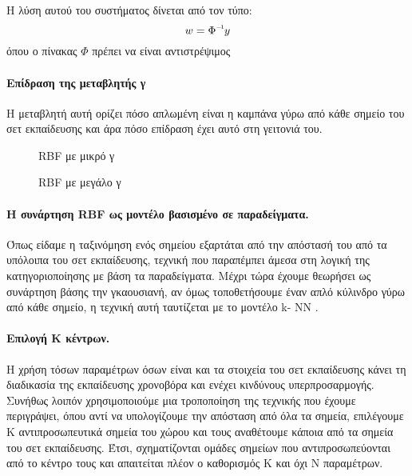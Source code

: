 Η λύση αυτού του συστήματος δίνεται από τον τύπο:
$$w=\inv{\Phi} y$$
όπου ο πίνακας $\Phi$ πρέπει να είναι αντιστρέψιμος

\paragraph{Επίδραση της μεταβλητής γ} Η μεταβλητή αυτή ορίζει πόσο απλωμένη είναι η καμπάνα γύρω από κάθε σημείο του σετ εκπαίδευσης και άρα πόσο επίδραση έχει αυτό στη γειτονιά του.
\begin{figure}[H]
	\centering
	\begin{minipage}{.5\textwidth}
		\centering
		\caption[RBF με μικρό γ]{RBF με μικρό γ}
		
	\end{minipage}%
	\begin{minipage}{0.5\textwidth}
		\centering
		\caption[RBF με μεγάλο γ]{RBF με μεγάλο γ}
		
	\end{minipage}
\end{figure}
\paragraph{H συνάρτηση RBF ως μοντέλο βασισμένο σε παραδείγματα.} Όπως είδαμε η ταξινόμηση ενός σημείου εξαρτάται από την απόστασή του από τα υπόλοιπα του σετ εκπαίδευσης, τεχνική που παραπέμπει άμεσα στη λογική της κατηγοριοποίησης με βάση τα παραδείγματα. Μέχρι τώρα έχουμε θεωρήσει ως συνάρτηση βάσης την γκαουσιανή, αν όμως τοποθετήσουμε έναν απλό κύλινδρο γύρω από κάθε σημείο, η τεχνική αυτή ταυτίζεται με το μοντέλο k-
NN .
\paragraph{Επιλογή Κ κέντρων.} Η χρήση τόσων παραμέτρων όσων είναι και τα στοιχεία του σετ εκπαίδευσης κάνει τη διαδικασία της εκπαίδευσης χρονοβόρα και ενέχει κινδύνους υπερπροσαρμογής. Συνήθως λοιπόν χρησιμοποιούμε μια τροποποίηση της τεχνικής που έχουμε περιγράψει, όπου αντί να υπολογίζουμε την απόσταση από όλα τα σημεία, επιλέγουμε Κ αντιπροσωπευτικά σημεία του χώρου και τους αναθέτουμε κάποια από τα σημεία του σετ εκπαίδευσης. Έτσι, σχηματίζονται ομάδες σημείων που αντιπροσωπεύονται από το κέντρο τους και απαιτείται πλέον ο καθορισμός Κ και όχι Ν παραμέτρων.

